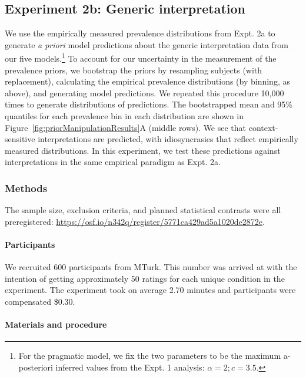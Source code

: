 \documentclass[floatsintext,doc]{apa6}
\let\oldparagraph\paragraph
\renewcommand{\paragraph}[1]{\oldparagraph{#1}\mbox{}}
\let\rmarkdownfootnote\footnote%
\def\footnote{\protect\rmarkdownfootnote}
\begin{document}
\hypertarget{experiment-2b-generic-interpretation}{%
\subsection{Experiment 2b: Generic interpretation}\label{experiment-2b-generic-interpretation}}

We use the empirically measured prevalence distributions from Expt. 2a to generate \emph{a priori} model predictions about the generic interpretation data from our five models.\footnote{For the pragmatic model, we fix the two parameters to be the maximum a-posteriori inferred values from the Expt. 1 analysis: \(\alpha = 2; c = 3.5\).}
To account for our uncertainty in the measurement of the prevalence priors, we bootstrap the priors by resampling subjects (with replacement), calculating the empirical prevalence distributions (by binning, as above), and generating model predictions.
We repeated this procedure 10,000 times to generate distributions of predictions.
The bootstrapped mean and 95\% quantiles for each prevalence bin in each distribution are shown in Figure~\ref{fig:priorManipulationResults}A (middle rows).
We see that context-sensitive interpretations are predicted, with idiosyncrasies that reflect empirically measured distributions.
In this experiment, we test these predictions against interpretations in the same empirical paradigm as Expt. 2a.

\hypertarget{methods-3}{%
\subsubsection{Methods}\label{methods-3}}

The sample size, exclusion criteria, and planned statistical contrasts were all preregistered: \url{https://osf.io/n342q/register/5771ca429ad5a1020de2872e}.

\hypertarget{participants-4}{%
\paragraph{Participants}\label{participants-4}}

We recruited 600 participants from MTurk.
This number was arrived at with the intention of getting approximately 50 ratings for each unique condition in the experiment.
The experiment took on average 2.70 minutes and participants were compensated \$0.30.

\hypertarget{materials-and-procedure}{%
\paragraph{Materials and procedure}\label{materials-and-procedure}}
\end{document}
